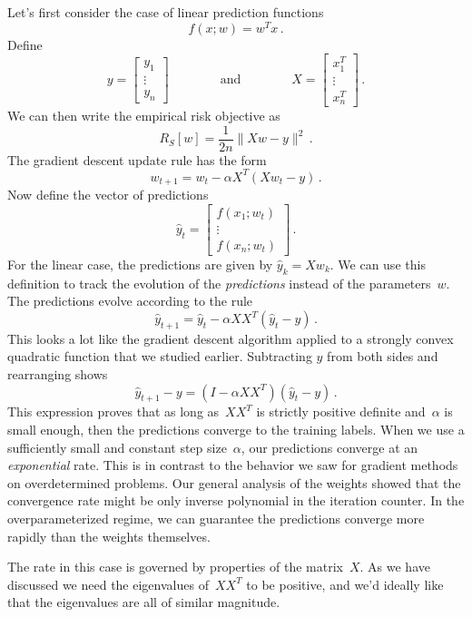 \documentclass{tufte-book}
\begin{document}
Let's first consider the case of linear prediction functions \[
    f(x;w) = w^T x\,.
\] Define \[
    y = \begin{bmatrix}
        y_1\\ \vdots \\ y_n
    \end{bmatrix}\qquad \qquad \text{and}\qquad \qquad X = \begin{bmatrix} x_1^T \\ \vdots \\x_n^T \end{bmatrix}\,.
\] We can then write the empirical risk objective as \[
R_S[w]=\frac1{2n}\|Xw-y\|^2\,.
\] The gradient descent update rule has the form
\[
    w_{t+1} = w_t - \alpha X^T (X w_t-y)\,.
\] Now define the vector of predictions \[
\hat{y}_t = \begin{bmatrix}
        f(x_1;w_t) \\ \vdots \\ f(x_n;w_t)
    \end{bmatrix}\,.
\] For the linear case, the predictions are given by
\(\hat{y}_k = X w_k\). We can use this definition to track the evolution
of the \emph{predictions} instead of the parameters~\(w\). The
predictions evolve according to the rule \[
    \hat{y}_{t+1} = \hat{y}_t - \alpha X X^T (\hat{y}_t-y)\,.
\] This looks a lot like the gradient descent algorithm applied to a
strongly convex quadratic function that we studied earlier. Subtracting
\(y\) from both sides and rearranging shows \[
    \hat{y}_{t+1}-y = (I - \alpha X X^T) (\hat{y}_t-y)\,.
\] This expression proves that as long as~\(XX^T\) is strictly
positive definite and~\(\alpha\) is small enough, then the predictions
converge to the training labels. When we use a sufficiently small and
constant step size~\(\alpha\), our predictions converge at an
\emph{exponential} rate. This is in contrast to the behavior we saw for
gradient methods on overdetermined problems. Our general analysis of the
weights showed that the convergence rate might be only inverse
polynomial in the iteration counter. In the overparameterized regime, we
can guarantee the predictions converge more rapidly than the weights
themselves.

The rate in this case is governed by properties of the matrix~\(X\). As
we have discussed we need the eigenvalues of~\(XX^T\) to be positive,
and we'd ideally like that the eigenvalues are all of similar magnitude.
\end{document}
